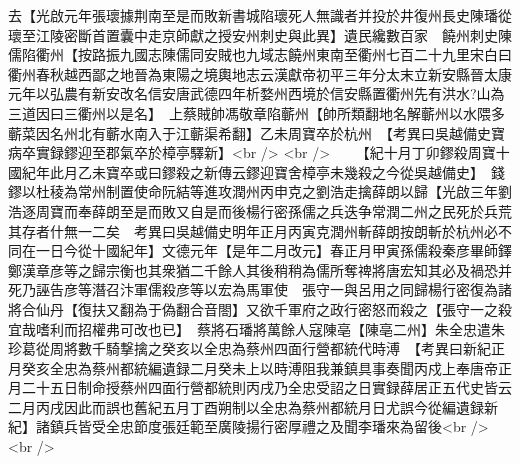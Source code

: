 去【光啟元年張瓌據荆南至是而敗新書城陷瓌死人無識者并投於井復州長史陳璠從瓌至江陵密斷首置囊中走京師獻之授安州刺史與此異】遺民纔數百家　饒州刺史陳儒陷衢州【按路振九國志陳儒同安賊也九域志饒州東南至衢州七百二十九里宋白曰衢州春秋越西鄙之地晉為東陽之境輿地志云漢獻帝初平三年分太末立新安縣晉太康元年以弘農有新安改名信安唐武德四年析婺州西境於信安縣置衢州先有洪水?山為三道因曰三衢州以是名】　上蔡賊帥馮敬章陷蘄州【帥所類翻地名解蘄州以水隈多蘄菜因名州北有蘄水南入于江蘄渠希翻】乙未周寶卒於杭州　【考異曰吳越備史寶病卒實録鏐迎至郡氣卒於樟亭驛新】<br />
<br />
　　【紀十月丁卯鏐殺周寶十國紀年此月乙未寶卒或曰鏐殺之新傳云鏐迎寶舍樟亭未幾殺之今從吳越備史】　錢鏐以杜稜為常州制置使命阮結等進攻潤州丙申克之劉浩走擒薛朗以歸【光啟三年劉浩逐周寶而奉薛朗至是而敗又自是而後楊行密孫儒之兵迭争常潤二州之民死於兵荒其存者什無一二矣　考異曰吳越備史明年正月丙寅克潤州斬薛朗按朗斬於杭州必不同在一日今從十國紀年】文德元年【是年二月改元】春正月甲寅孫儒殺秦彦畢師鐸鄭漢章彦等之歸宗衡也其衆猶二千餘人其後稍稍為儒所奪禆將唐宏知其必及禍恐并死乃誣告彦等潛召汴軍儒殺彦等以宏為馬軍使　張守一與呂用之同歸楊行密復為諸將合仙丹【復扶又翻為于偽翻合音閤】又欲千軍府之政行密怒而殺之【張守一之殺宜哉嗜利而招權弗可改也已】　蔡將石璠將萬餘人寇陳亳【陳亳二州】朱全忠遣朱珍葛從周將數千騎撃擒之癸亥以全忠為蔡州四面行營都統代時溥　【考異曰新紀正月癸亥全忠為蔡州都統編遺録二月癸未上以時溥阻我兼鎮具事奏聞丙戍上奉唐帝正月二十五日制命授蔡州四面行營都統則丙戌乃全忠受詔之日實録薛居正五代史皆云二月丙戌因此而誤也舊紀五月丁酉朔制以全忠為蔡州都統月日尤誤今從編遺録新紀】諸鎮兵皆受全忠節度張廷範至廣陵揚行密厚禮之及聞李璠來為留後<br />
<br />
